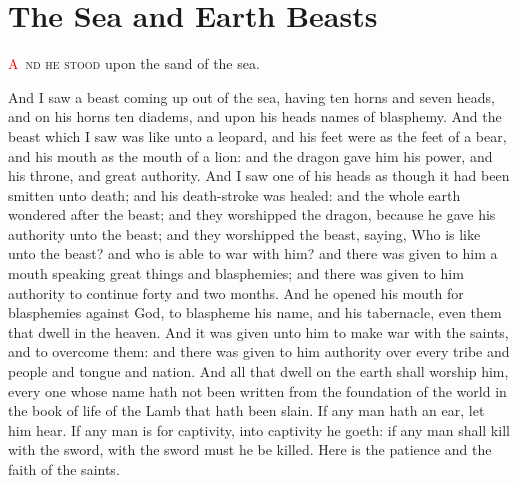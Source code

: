 
\chapter{The Sea and Earth Beasts}
\lettrine[lines=3]{\textcolor{red}{A}}{\ nd he stood} upon the sand of the sea.

And I saw a beast coming up out of the sea, having ten horns and seven heads, and on his horns ten diadems, and upon his heads names of blasphemy. 
 And the beast which I saw was like unto a leopard, and his feet were as the feet of a bear, and his mouth as the mouth of a lion: and the dragon gave him his power, and his throne, and great authority. 
 And I saw one of his heads as though it had been smitten unto death; and his death-stroke was healed: and the whole earth wondered after the beast; 
 and they worshipped the dragon, because he gave his authority unto the beast; and they worshipped the beast, saying, Who is like unto the beast? and who is able to war with him? 
 and there was given to him a mouth speaking great things and blasphemies; and there was given to him authority to continue forty and two months. 
 And he opened his mouth for blasphemies against God, to blaspheme his name, and his tabernacle, even them that dwell in the heaven. 
 And it was given unto him to make war with the saints, and to overcome them: and there was given to him authority over every tribe and people and tongue and nation. 
 And all that dwell on the earth shall worship him, every one whose name hath not been written from the foundation of the world in the book of life of the Lamb that hath been slain. 
 If any man hath an ear, let him hear. 
 If any man is for captivity, into captivity he goeth: if any man shall kill with the sword, with the sword must he be killed. Here is the patience and the faith of the saints.

